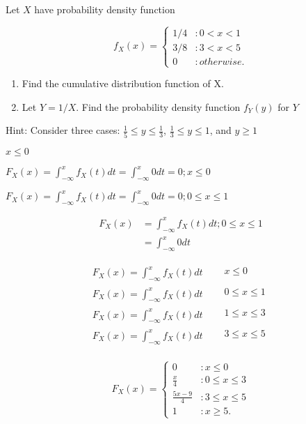 \item Let $X$ have probability density function

\[f_X(x) = \left\{
  \begin{array}{lr}
    1/4 & : 0<x<1\\
    3/8 & : 3<x<5\\
    0 & : otherwise.
  \end{array}
\right.
\]

\begin{enumerate}[label=(\alph*)]
\item Find the cumulative distribution function of X.
\item Let $Y = 1/X$. Find the probability density function $f_Y(y)$ for $Y$
\end{enumerate}
Hint: Consider three cases: $ \frac{1}{5} \leq y \leq \frac{1}{3} $,
$ \frac{1}{3} \leq y \leq 1 $, and $ y \geq 1$

\bigskip


$x \leq 0$
\bigskip

$F_X(x) = \displaystyle\int_{-\infty}^{x} f_X(t) dt = \displaystyle\int_{-\infty}^{x} 0 dt = 0; x \leq 0$

$F_X(x) = \displaystyle\int_{-\infty}^{x} f_X(t) dt = \displaystyle\int_{-\infty}^{x} 0 dt = 0; 0 \le x \le 1 $

\begin{align*}
F_X(x) & = \displaystyle\int_{-\infty}^{x} f_X(t) dt ; 0 \le x \le 1
\\&= \displaystyle\int_{-\infty}^{x} 0 dt
\end{align*}

\begin{align*}
F_X(x) = \displaystyle\int_{-\infty}^{x} f_X(t) dt
&\quad  \begin{aligned}
                x \leq 0\\
        \end{aligned}   \\
F_X(x) = \displaystyle\int_{-\infty}^{x} f_X(t) dt
&\quad  \begin{aligned}
                0 \le x  \le 1\\
        \end{aligned} \\
F_X(x) = \displaystyle\int_{-\infty}^{x} f_X(t) dt
&\quad  \begin{aligned}
                1 \leq x  \leq 3\\
        \end{aligned} \\
F_X(x) = \displaystyle\int_{-\infty}^{x} f_X(t) dt
&\quad  \begin{aligned}
                3 \le x  \le 5\\
        \end{aligned} \\
\end{align*}

\[F_X(x) = \left\{
  \begin{array}{lr}
    0 &   : x \leq 0\\
    \frac{x}{4} & : 0 \le x \leq 3\\
    \frac{5x-9}{4} & : 3 \le x \le 5\\
    1 & : x \geq 5.
  \end{array}
\right.
\]
